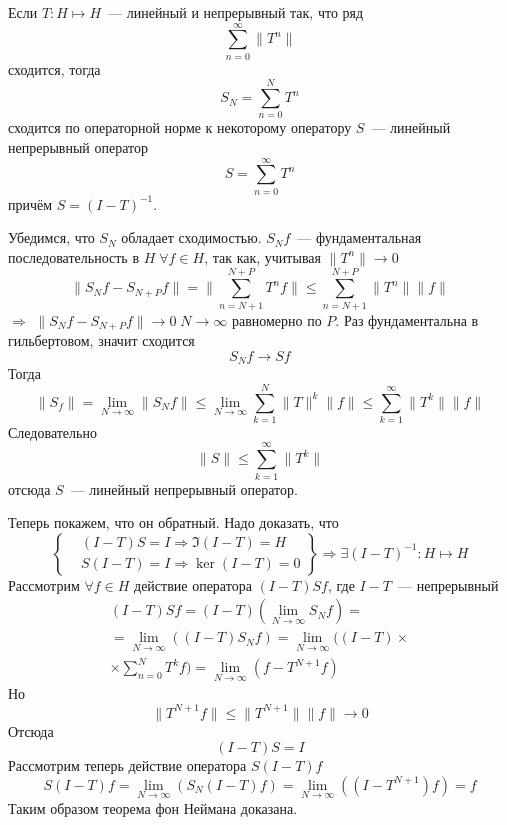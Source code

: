 \documentclass[14pt]{extarticle}
\begin{document}
\begin{Theor}
    Если $T : H \mapsto H$~--- линейный и непрерывный так, что ряд 
    $$
    \sum_{n = 0}^\infty \|T^n\|
    $$
    сходится, тогда
    $$
    S_N = \sum_{n = 0}^N T^n
    $$
    сходится по операторной норме
    к некоторому оператору $S$~--- линейный непрерывный оператор
    $$
    S = \sum_{n = 0}^\infty T^n
    $$
    причём $S = (I - T)^{-1}$.
\end{Theor}
\begin{Proof}
    Убедимся, что $S_N$ обладает сходимостью.
    $S_N f$~--- фундаментальная последовательность в $H\; \forall f \in H$, так как,
    учитывая $\|T^n\| \to 0$ 
    $$
    \|S_N f - S_{N+P} f\| = \|\sum_{n = N + 1}^{N + P} T^n f\|
    \le \sum_{n = N + 1}^{N + P}\|T^n\|\|f\| 
    $$
    $\Rightarrow$ $\|S_N f - S_{N+P} f\| \to 0\; N \to \infty$ равномерно по $P$.
    Раз фундаментальна в гильбертовом, значит сходится 
    $$
    S_N f \to Sf
    $$
    Тогда 
    $$
    \|S_f\| = \lim \limits_{N \to \infty}\|S_N f\| \le \lim \limits_{N \to \infty} \sum_{k = 1}^N \|T\|^k\|f\| \le \sum_{k = 1}^{\infty} \|T^k\| \|f\|
    $$
    Следовательно 
    $$
    \|S\| \le \sum \limits_{k = 1}^{\infty}\|T^k\|
    $$ 
    отсюда $S$~--- линейный непрерывный оператор.

    Теперь покажем, что он обратный.
    Надо доказать, что 
    $$
    \left\{
        \begin{aligned}
            &(I - T)S = I \Rightarrow \Im(I - T) = H\\
            &S(I - T) = I \Rightarrow \ker(I - T) = 0
        \end{aligned}
    \right\} \Rightarrow \exists (I - T)^{-1} : H \mapsto H
    $$
    Рассмотрим $\forall f \in H$ действие оператора $(I - T)Sf$, где $I - T$~--- непрерывный
    \begin{multline*}
    (I - T)Sf = (I - T)(\lim \limits_{N \to \infty} S_N f) = \\
    = \lim \limits_{N \to \infty}((I - T)S_N f) 
    = \lim \limits_{N \to \infty}((I - T) \times \\
    \times \sum\limits_{n = 0}^N T^k f) = \lim \limits_{N \to \infty}(f - T^{N+1}f)
    \end{multline*}
    Но
    $$
    \|T^{N+1}f\| \le \|T^{N+1}\|\|f\| \to 0
    $$
    Отсюда 
    $$
    (I - T)S = I
    $$
    Рассмотрим теперь действие оператора $S(I - T)f$
    $$
    S(I - T)f = \lim \limits_{N \to \infty}(S_N(I - T)f) = \lim \limits_{N \to \infty}((I - T^{N+1})f) = f
    $$
    Таким образом теорема фон Неймана доказана.
\end{Proof}
\end{document}
